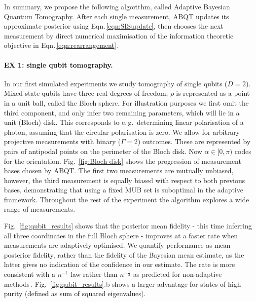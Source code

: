 \documentclass[aps,twocolumn,prl]{revtex4-1}
\newcommand{\config}{\alpha} \newcommand{\configset}{\mathcal{A}}
\newcommand{\eg}{e.\,g.\ }
\begin{document}
In summary, we propose the following algorithm, called Adaptive Bayesian Quantum Tomography. After each single measurement, ABQT updates its approximate posterior using Eqn.\,\eqref{eqn:SISupdate}, then chooses the next measurement by direct numerical maximisation of the information theoretic objective in Eqn.\,\eqref{eqn:rearrangement}.

\paragraph{EX 1: single qubit tomography.} In our first simulated experiments we study tomography of single qubits ($D=2$). Mixed state qubits have three real degrees of freedom, $\rho$ is represented as a point in a unit ball, called the Bloch sphere. For illustration purposes we first omit the third component, and only infer two remaining parameters, which will lie in a unit (Bloch) disk. This corresponds to \eg determining linear polarisation of a photon, assuming that the circular polarisation is zero. We allow for arbitrary projective measurements with binary ($\Gamma = 2$) outcomes. These are represented by pairs of antipodal points on the perimeter of the Bloch disk. Now $\config\in[0,\pi)$ codes for the orientation. Fig.\ \ref{fig:Bloch disk} shows the progression of measurement bases chosen by ABQT. The first two measurements are mutually unbiased, however, the third measurement is equally biased with respect to both previous bases, demonstrating that using a fixed MUB set is suboptimal in the adaptive framework. Throughout the rest of the experiment the algorithm explores a wide range of measurements.

Fig.\ \ref{fig:qubit_results} shows that the posterior mean fidelity - this time inferring all three coordinates in the full Bloch sphere - improves at a faster rate when measurements are adaptively optimised. We quantify performance as mean posterior fidelity, rather than the fidelity of the Bayesian mean estimate, as the latter gives no indication of the confidence in our estimate. The rate is more consistent with a $n^{-1}$ law rather than $n^{-\frac{1}{2}}$ as predicted for non-adaptive methods\,\cite[][and refs.]{MUBExperiment}. Fig.\ \ref{fig:qubit_results}.b shows a larger advantage for states of high purity (defined as sum of squared eigenvalues).
\end{document}
